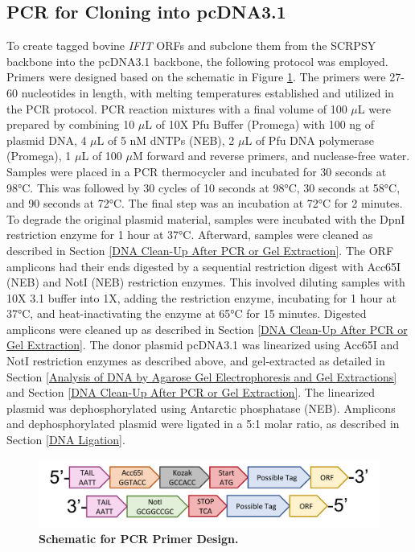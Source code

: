 \subsection{PCR for Cloning into pcDNA3.1} \label{subsec:PCR for Cloning into pcDNA3.1}
To create tagged bovine \textit{IFIT} ORFs and subclone them from the SCRPSY backbone into the pcDNA3.1 backbone, the following protocol was employed. Primers were designed based on the schematic in Figure \ref{fig:Schematic for PCR Primer Design}. The primers were 27-60 nucleotides in length, with melting temperatures established and utilized in the PCR protocol. PCR reaction mixtures with a final volume of 100 \(\mu\)L were prepared by combining 10 \(\mu\)L of 10X Pfu Buffer (Promega) with 100 ng of plasmid DNA, 4 \(\mu\)L of 5 nM dNTPs (NEB), 2 \(\mu\)L of Pfu DNA polymerase (Promega), 1 \(\mu\)L of 100 \(\mu\)M forward and reverse primers, and nuclease-free water. Samples were placed in a PCR thermocycler and incubated for 30 seconds at 98°C. This was followed by 30 cycles of 10 seconds at 98°C, 30 seconds at 58°C, and 90 seconds at 72°C. The final step was an incubation at 72°C for 2 minutes. To degrade the original plasmid material, samples were incubated with the DpnI restriction enzyme for 1 hour at 37°C. Afterward, samples were cleaned as described in Section \ref{DNA Clean-Up After PCR or Gel Extraction}. The ORF amplicons had their ends digested by a sequential restriction digest with Acc65I (NEB) and NotI (NEB) restriction enzymes. This involved diluting samples with 10X 3.1 buffer into 1X, adding the restriction enzyme, incubating for 1 hour at 37°C, and heat-inactivating the enzyme at 65°C for 15 minutes. Digested amplicons were cleaned up as described in Section \ref{DNA Clean-Up After PCR or Gel Extraction}. The donor plasmid pcDNA3.1 was linearized using Acc65I and NotI restriction enzymes as described above, and gel-extracted as detailed in Section \ref{Analysis of DNA by Agarose Gel Electrophoresis and Gel Extractions} and Section \ref{DNA Clean-Up After PCR or Gel Extraction}. The linearized plasmid was dephosphorylated using Antarctic phosphatase (NEB). Amplicons and dephosphorylated plasmid were ligated in a 5:1 molar ratio, as described in Section \ref{DNA Ligation}.

\begin{figure}
    \centering
    \includegraphics[width=1\linewidth]{05. Methods//Figs/03. cloning scheme.pdf}
    \caption[Schematic for PCR Primer Design.]{\textbf{Schematic for PCR Primer Design.}}
    \label{fig:Schematic for PCR Primer Design}
\end{figure}

